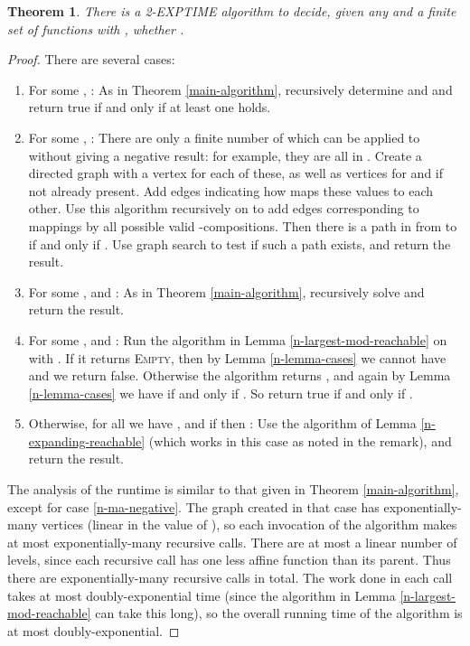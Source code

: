 \documentclass[11pt]{amsart}
\newtheorem{theorem}{Theorem}
\theoremstyle{definition}
\theoremstyle{remark}
\begin{document}
\begin{theorem}
There is a \textsf{2-EXPTIME} algorithm to decide, given any  and a finite set  of functions  with , whether .
\end{theorem}
\begin{proof}
There are several cases:
\begin{enumerate}
\item For some , : As in Theorem \ref{main-algorithm}, recursively determine  and  and return true if and only if at least one holds.
\item For some , : There are only a finite number of  which  can be applied to without giving a negative result: for example, they are all in . Create a directed graph  with a vertex for each of these, as well as vertices for  and  if not already present. Add edges indicating how  maps these values to each other. Use this algorithm recursively on  to add edges corresponding to mappings by all possible valid -compositions. Then there is a path in  from  to  if and only if . Use graph search to test if such a path exists, and return the result. \label{n-ma-negative}
\item For some ,  and : As in Theorem \ref{main-algorithm}, recursively solve  and return the result.
\item For some ,  and : Run the algorithm in Lemma \ref{n-largest-mod-reachable} on  with . If it returns \textsc{Empty}, then by Lemma \ref{n-lemma-cases} we cannot have  and we return false. Otherwise the algorithm returns , and again by Lemma \ref{n-lemma-cases} we have  if and only if . So return true if and only if .
\item Otherwise, for all  we have , and if  then : Use the algorithm of Lemma \ref{n-expanding-reachable} (which works in this case as noted in the remark), and return the result.
\end{enumerate}
The analysis of the runtime is similar to that given in Theorem \ref{main-algorithm}, except for case \ref{n-ma-negative}. The graph  created in that case has exponentially-many vertices (linear in the value of ), so each invocation of the algorithm makes at most exponentially-many recursive calls. There are at most a linear number of levels, since each recursive call has one less affine function than its parent. Thus there are exponentially-many recursive calls in total. The work done in each call takes at most doubly-exponential time (since the algorithm in Lemma \ref{n-largest-mod-reachable} can take this long), so the overall running time of the algorithm is at most doubly-exponential.
\end{proof}
\end{document}
